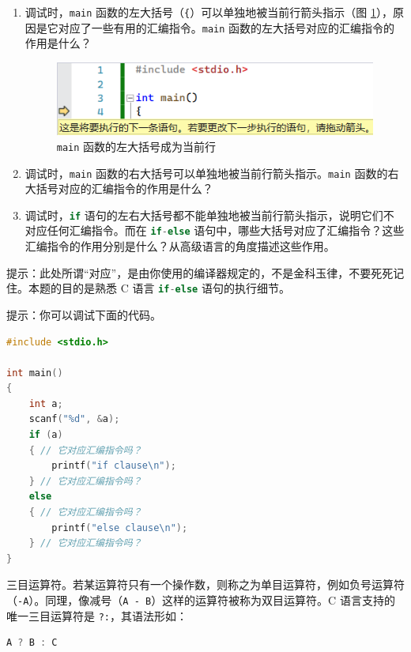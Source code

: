 \begin{problemset}
	\begin{enumerate}
		\item 调试时，\lstinline{main} 函数的左大括号（\lstinline{{}）可以单独地被当前行箭头指示（图 \ref{pic:brace}），原因是它对应了一些有用的汇编指令。\lstinline{main} 函数的左大括号对应的汇编指令的作用是什么？

		\begin{figure}[H]
			\centering
			\includegraphics[width=0.75\linewidth]{pic/brace.png}
			\caption{\lstinline{main} 函数的左大括号成为当前行}
			\label{pic:brace}
		\end{figure}

		\item 调试时，\lstinline{main} 函数的右大括号可以单独地被当前行箭头指示。\lstinline{main} 函数的右大括号对应的汇编指令的作用是什么？

		\item 调试时，\lstinline[language=c]{if} 语句的左右大括号都不能单独地被当前行箭头指示，说明它们不对应任何汇编指令。而在 \lstinline[language=c]{if-else} 语句中，哪些大括号对应了汇编指令？这些汇编指令的作用分别是什么？从高级语言的角度描述这些作用。
	\end{enumerate}

	提示：此处所谓“对应”，是由你使用的编译器规定的，不是金科玉律，不要死死记住。本题的目的是熟悉 C 语言 \lstinline[language=c]{if-else} 语句的执行细节。

	提示：你可以调试下面的代码。

		\begin{lstlisting}[language=c]
#include <stdio.h>

int main()
{
	int a;
	scanf("%d", &a);
	if (a)
	{ // 它对应汇编指令吗？
		printf("if clause\n");
	} // 它对应汇编指令吗？
	else
	{ // 它对应汇编指令吗？
		printf("else clause\n");
	} // 它对应汇编指令吗？
}
		\end{lstlisting}

	\item 三目运算符。若某运算符只有一个操作数，则称之为单目运算符，例如负号运算符（\lstinline{-A}）。同理，像减号（\lstinline{A - B}）这样的运算符被称为双目运算符。C 语言支持的唯一三目运算符是 \lstinline{?:}，其语法形如：
	\begin{lstlisting}[language=c, numbers=none]
A ? B : C
	\end{lstlisting}


\end{problemset}
